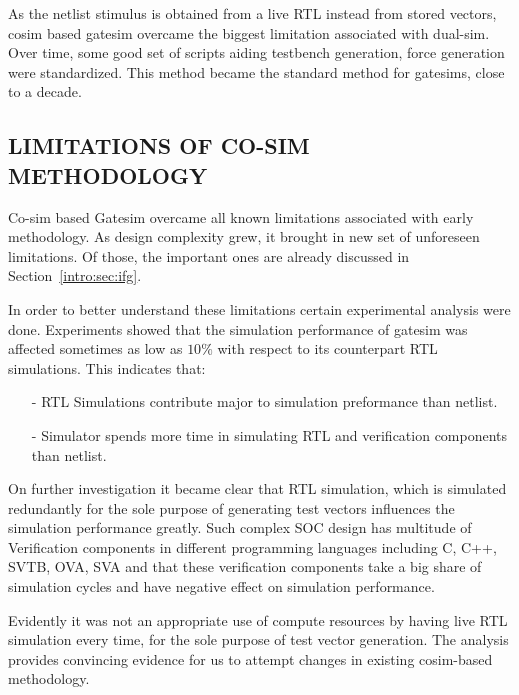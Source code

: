 As the netlist stimulus is obtained from a live RTL instead from stored vectors, cosim based gatesim overcame the biggest limitation associated with dual-sim. Over time, some good set of scripts aiding testbench generation, force generation were standardized. This method became the standard method for gatesims, close to a decade.

\subsection {LIMITATIONS OF CO-SIM METHODOLOGY}

Co-sim based Gatesim overcame all known limitations associated with early methodology. As design complexity grew, it brought in new set of unforeseen limitations. Of those, the important ones are already discussed in Section~\ref{intro:sec:ifg}.

In order to better understand these limitations certain experimental analysis were done. Experiments showed that the simulation performance of gatesim was affected sometimes as low as $10\%$ with respect to its counterpart RTL simulations. This indicates that:

\begin{itemize}
	\item[-]RTL Simulations contribute major to simulation preformance than netlist.
	\item[-]Simulator spends more time in simulating RTL and verification components than netlist.
\end{itemize}

On further investigation it became clear that RTL simulation, which is simulated redundantly for the sole purpose of generating test vectors influences the simulation performance greatly. Such complex SOC design has multitude of Verification components in different programming languages including C, C++, SVTB, OVA, SVA and that these verification components take a big share of simulation cycles and have negative effect on simulation performance.

Evidently it was not an appropriate use of compute resources by having live RTL simulation every time, for the sole purpose of test vector generation. The analysis provides convincing evidence for us to attempt changes in existing cosim-based methodology.

